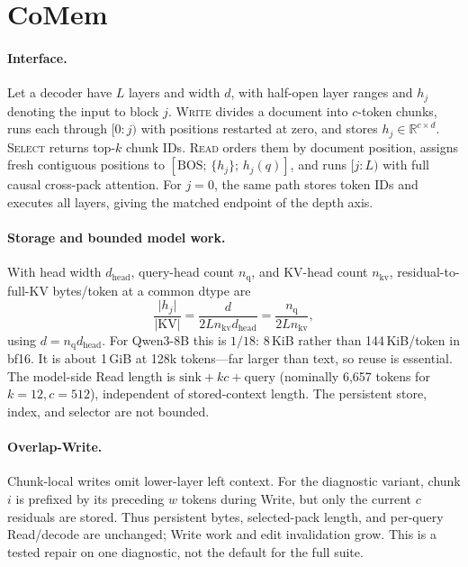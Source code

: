 \section{CoMem}
\label{sec:method}

\paragraph{Interface.}
Let a decoder have $L$ layers and width $d$, with half-open layer ranges and
$h_j$ denoting the input to block $j$. \textsc{Write} divides a document into
$c$-token chunks, runs each through $[0{:}j)$ with positions restarted at zero,
and stores $h_j\in\mathbb{R}^{c\times d}$. \textsc{Select} returns top-$k$
chunk IDs. \textsc{Read} orders them by document position, assigns fresh
contiguous positions to $[\mathrm{BOS};\,\{h_j\};\,h_j(q)]$, and runs
$[j{:}L)$ with full causal cross-pack attention. For $j{=}0$, the same path
stores token IDs and executes all layers, giving the matched endpoint of the
depth axis.

\paragraph{Storage and bounded model work.}
With head width $d_{\mathrm{head}}$, query-head count $n_{\mathrm q}$, and
KV-head count $n_{\mathrm{kv}}$, residual-to-full-KV bytes/token at a common
dtype are
\begin{equation}
\frac{\lvert h_j\rvert}{\lvert\mathrm{KV}\rvert}
=\frac{d}{2L n_{\mathrm{kv}}d_{\mathrm{head}}}
=\frac{n_{\mathrm{q}}}{2L n_{\mathrm{kv}}},
\label{eq:store}
\end{equation}
using $d=n_{\mathrm q}d_{\mathrm{head}}$. For Qwen3-8B this is $1/18$:
8\,KiB rather than 144\,KiB/token in bf16. It is about 1\,GiB at 128k
tokens---far larger than text, so reuse is essential. The model-side Read length
is $\mathrm{sink}+kc+\mathrm{query}$ (nominally 6,657 tokens for
$k{=}12,c{=}512$), independent of stored-context length. The persistent store,
index, and selector are not bounded.

\paragraph{Overlap-Write.}
Chunk-local writes omit lower-layer left context. For the diagnostic variant,
chunk $i$ is prefixed by its preceding $w$ tokens during Write, but only the
current $c$ residuals are stored. Thus persistent bytes, selected-pack length,
and per-query Read/decode are unchanged; Write work and edit invalidation grow.
This is a tested repair on one diagnostic, not the default for the full suite.

